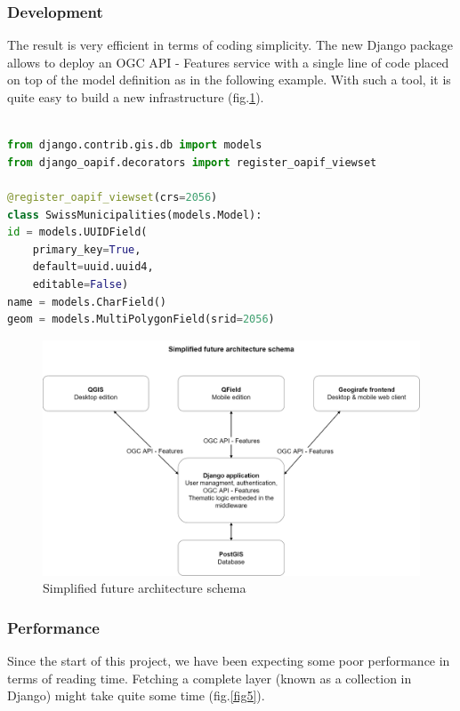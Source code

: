 \documentclass[runningheads]{llncs}
\begin{document}
\subsubsection{Development}

The result is very efficient in terms of coding simplicity. The new Django package allows to deploy an OGC API - Features service with a single line of code placed on top of the model definition as in the following example. With such a tool, it is quite easy to build a new infrastructure (fig.\ref{fig4}).

\begin{lstlisting}[language=Python, caption=Python code sample]

from django.contrib.gis.db import models
from django_oapif.decorators import register_oapif_viewset

@register_oapif_viewset(crs=2056)
class SwissMunicipalities(models.Model):
id = models.UUIDField(
	primary_key=True,
	default=uuid.uuid4, 
	editable=False)
name = models.CharField()
geom = models.MultiPolygonField(srid=2056)
\end{lstlisting}


\begin{figure}
	\includegraphics[width=\textwidth]{future-architecture.png}
	\caption{Simplified future architecture schema} \label{fig4}
\end{figure}


\subsubsection{Performance}

Since the start of this project, we have been expecting some poor performance in terms of reading time. Fetching a complete layer (known as a collection in Django) might take quite some time (fig.\ref{fig5}).
\end{document}
